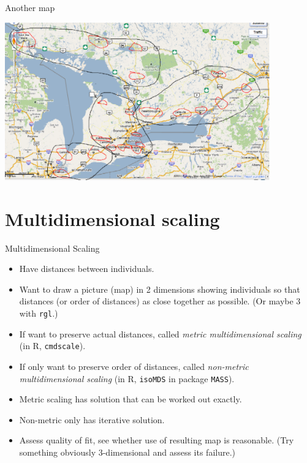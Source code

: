 \documentclass[unknownkeysallowed]{beamer}\usepackage[]{graphicx}\usepackage[]{color}
\begin{document}
\begin{frame}[fragile]{Another map}

\includegraphics[width=4.5in]{map2}




\end{frame}



\section{Multidimensional scaling}

\frame{\sectionpage}


\begin{frame}[fragile]{Multidimensional Scaling}

  \begin{itemize}
  \item Have distances between individuals.
  \item Want to draw a picture (map) in 2 dimensions showing
    individuals so that distances (or order of distances) as close
    together as possible. (Or maybe 3 with \texttt{rgl}.)
  \item If want to preserve actual distances, called {\em metric
      multidimensional scaling} (in R, \texttt{cmdscale}).
  \item If only want to preserve order of distances, called {\em
      non-metric multidimensional scaling} (in R, \texttt{isoMDS} in
    package \texttt{MASS}).
  \item Metric scaling has solution that can be worked out exactly.
  \item Non-metric only has iterative solution.
  \item Assess quality of fit, see whether use of resulting map is
    reasonable. (Try something obviously 3-dimensional and assess its
    failure.)
  \end{itemize}

\end{frame}
\end{document}
